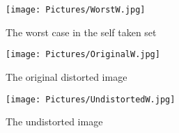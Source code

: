 \documentclass[11pt,a4paper]{article}
\begin{document}
\begin{center}
  \begin{figure}[ht]
    \texttt{[image: Pictures/WorstW.jpg]}
    \caption{The worst case in the self taken set}
    \label{figure:worst}
  \end{figure}
  \begin{figure}[ht]
    \texttt{[image: Pictures/OriginalW.jpg]}
    \caption{The original distorted image}
  \end{figure}  
  \begin{figure}[ht]
    \texttt{[image: Pictures/UndistortedW.jpg]}
    \caption{The undistorted image}
  \end{figure}
\end{center}
\end{document}
